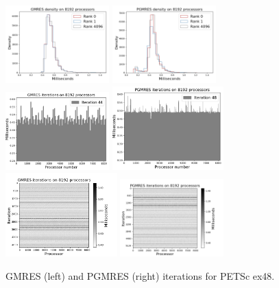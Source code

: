\documentclass[sigconf, anonymous]{acmart}
\begin{document}
\begin{figure}[t]
\centering
\includegraphics[width=4cm]{../plots/GMRES_ex48_8192_1000000_identical_in_p.png}
\includegraphics[width=4cm]{../plots/PGMRES_ex48_8192_1000000_identical_in_p.png} \\
\includegraphics[width=4cm]{../plots/GMRES_ex48_8192_1000000_independent_in_p_44.pdf}
\includegraphics[width=4.3cm]{../plots/PGMRES_ex48_8192_1000000_independent_in_p_48.pdf} \\
\includegraphics[width=4.3cm]{../plots/GMRES_ex48_8192_1000000_stationary_in_t_colormap.png} \includegraphics[width=4cm]{../plots/PGMRES_ex48_8192_1000000_stationary_in_t_colormap.png}
\caption{GMRES (left) and PGMRES (right) iterations for PETSc ex48.} \label{fig:ex48}
\end{figure}
\end{document}
